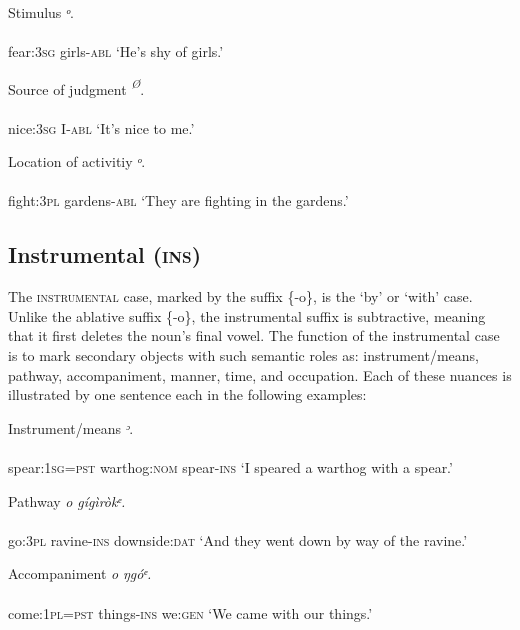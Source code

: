 Stimulus
\ea\label{ex:}
\textit{ᵒ}. \\
    \\
fear:\textsc{3sg}   girls-\textsc{abl}
\glt ‘He’s shy of girls.’ 
\z




Source of judgment
\ea\label{ex:}
\textit{\textsuperscript{Ø}}. \\
    \\
nice:\textsc{3sg}   I-\textsc{abl}
\glt ‘It’s nice to me.’ 
\z




Location of activitiy
\ea\label{ex:}
\textit{ᵒ}. \\
    \\
fight:\textsc{3pl}   gardens-\textsc{abl}
\glt ‘They are fighting in the gardens.’ 
\z






\subsection{Instrumental (\textsc{ins})}


The \textsc{instrumental} case, marked by the suffix \{-o\}, is the ‘by’ or ‘with’ case. Unlike the ablative suffix \{-o\}, the instrumental suffix is subtractive, meaning that it first deletes the noun’s final vowel. The function of the instrumental case is to mark secondary objects with such semantic roles as: instrument/means, pathway, accompaniment, manner, time, and occupation. Each of these nuances is illustrated by one sentence each in the following examples:




Instrument/means
\ea\label{ex:}
\textit{ᵓ}. \\
    \\
spear:\textsc{1sg}=\textsc{pst}   warthog:\textsc{nom}   spear-\textsc{ins}
\glt ‘I speared a warthog with a spear.’ 
\z




Pathway
\ea\label{ex:}
\textit{o}\textit{     gígìròkᵉ.} \\
    \\
go:\textsc{3pl}   ravine-\textsc{ins}   downside:\textsc{dat}
\glt ‘And they went down by way of the ravine.’ 
\z



Accompaniment
\ea\label{ex:}
\textit{o}\textit{   ŋgóᵉ.} \\
    \\
come:\textsc{1pl}=\textsc{pst}   things-\textsc{ins}   we:\textsc{gen}
\glt ‘We came with our things.’ 
\z




